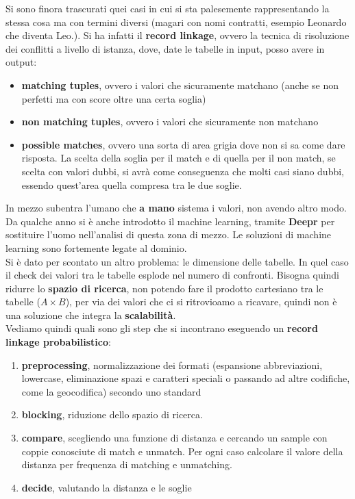 Si sono finora trascurati quei casi in cui si sta palesemente rappresentando la stessa cosa ma con termini diversi (magari con nomi contratti, esempio Leonardo che diventa Leo.). Si ha infatti il \textbf{record linkage}, ovvero la tecnica di risoluzione dei conflitti a livello di istanza, dove, date le tabelle in input, posso avere in output:
\begin{itemize}
  \item \textbf{matching tuples}, ovvero i valori che sicuramente matchano (anche se non perfetti ma con score oltre una certa soglia)
  \item \textbf{non matching tuples}, ovvero i valori che sicuramente non matchano
  \item \textbf{possible matches}, ovvero una sorta di area grigia dove non si sa come dare risposta. La scelta della soglia per il match e di quella per il non match, se scelta con valori dubbi, si avrà come conseguenza che molti casi siano dubbi, essendo quest'area quella compresa tra le due soglie.
\end{itemize}
In mezzo subentra l'umano che \textbf{a mano} sistema i valori, non avendo altro modo. Da qualche anno si è anche introdotto il machine learning, tramite \textbf{Deepr} per sostituire l'uomo nell'analisi di questa zona di mezzo. Le soluzioni di machine learning sono fortemente legate al dominio. \\

Si è dato per scontato un altro problema: le dimensione delle tabelle. In quel caso il check dei valori tra le tabelle esplode nel numero di confronti. Bisogna quindi ridurre lo \textbf{spazio di ricerca}, non potendo fare il prodotto cartesiano tra le tabelle ($ A\times B$), per via dei valori che ci si ritrovioamo a ricavare, quindi non è una soluzione che integra la \textbf{scalabilità}. \\
Vediamo quindi quali sono gli step che si incontrano eseguendo un \textbf{record linkage probabilistico}:
\begin{enumerate}
  \item \textbf{preprocessing}, normalizzazione dei formati (espansione abbreviazioni, lowercase, eliminazione spazi e caratteri speciali o passando ad altre codifiche, come la geocodifica) secondo uno standard
  \item \textbf{blocking}, riduzione dello spazio di ricerca. 
  \item \textbf{compare}, scegliendo una funzione di distanza e cercando un sample con coppie conosciute di match e unmatch. Per ogni caso calcolare il valore della distanza per frequenza di matching e unmatching.
  \item \textbf{decide}, valutando la distanza e le soglie
\end{enumerate}

